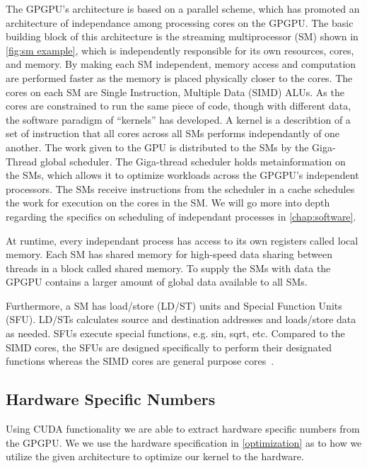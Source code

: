 The GPGPU's architecture is based on a parallel scheme, which has promoted an architecture of independance among processing cores on the GPGPU.
The basic building block of this architecture is the streaming multiprocessor (SM) shown in \cref{fig:sm example}, which is independently responsible for its own resources, cores, and memory.
By making each SM independent, memory access and computation are performed faster as the memory is placed physically closer to the cores.
The cores on each SM are Single Instruction, Multiple Data (SIMD) ALUs.
As the cores are constrained to run the same piece of code, though with different data, the software paradigm of ``kernels'' has developed.
A kernel is a describtion of a set of instruction that all cores across all SMs performs independantly of one another.
The work given to the GPU is distributed to the SMs by the Giga-Thread global scheduler.
The Giga-thread scheduler holds metainformation on the SMs, which allows it to optimize workloads across the GPGPU's independent processors.
The SMs receive instructions from the scheduler in a cache schedules the work for execution on the cores in the SM.
We will go more into depth regarding the specifics on scheduling of independant processes in \cref{chap:software}.

At runtime, every independant process has access to its own registers called local memory.
Each SM has shared memory for high-speed data sharing between threads in a block called shared memory.
To supply the SMs with data the GPGPU contains a larger amount of global data available to all SMs.

Furthermore, a SM has load/store (LD/ST) units and Special Function Units (SFU).
LD/STs calculates source and destination addresses and loads/store data as needed.
SFUs execute special functions, e.g. sin, sqrt, etc.
Compared to the SIMD cores, the SFUs are designed specifically to perform their designated functions whereas the SIMD cores are general purpose cores~\cite{fermi2009nvidia}.


\subsection{Hardware Specific Numbers}
\label{sec:hardware specific numbers}
Using CUDA functionality we are able to extract hardware specific numbers from the GPGPU.
We we use the hardware specification in \cref{optimization} as to how we utilize the given architecture to optimize our kernel to the hardware.

